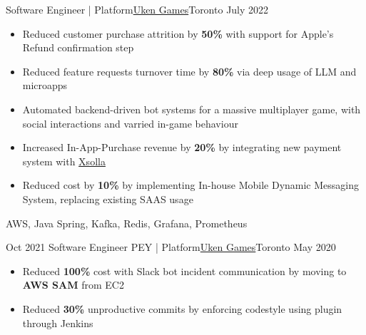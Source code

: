 %
%
%
\begin{experiences}
  \experienceCurrent
    {Software Engineer | Platform}{\href{https://uken.com}{Uken Games}}{Toronto}
    {July 2022} {
                    \begin{itemize}
                        \setlength\itemsep{0.6em}

                        \item Reduced customer purchase attrition by \textbf{50\%} with support for Apple's Refund confirmation step

                        \item Reduced feature requests turnover time by \textbf{80\%} via deep usage of LLM and microapps

                        \item Automated backend-driven bot systems for a massive multiplayer game, with social interactions and varried in-game behaviour

                        \item Increased In-App-Purchase revenue by \textbf{20\%} by integrating new payment system with \href{https://xsolla.com}{Xsolla} 

                        \item Reduced cost by \textbf{10\%} by implementing In-house Mobile Dynamic Messaging System, replacing existing SAAS usage
                    \end{itemize}
                    }
                    {AWS, Java Spring, Kafka, Redis, Grafana, Prometheus}

  \emptySeparator
  \experience
    {Oct 2021}   {Software Engineer PEY | Platform}{\href{https://uken.com}{Uken Games}}{Toronto}
    {May 2020} {
                    \begin{itemize}
                        \setlength\itemsep{0.6em}
                        \item Reduced \textbf{100\%} cost with Slack bot incident communication by moving to \textbf{AWS SAM} from EC2
                        
                        \item Reduced \textbf{30\%} unproductive commits by enforcing codestyle using  plugin through Jenkins


\end{itemize}}
\end{experiences}
